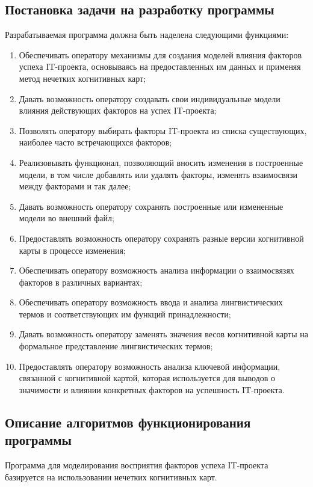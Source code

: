\documentclass{article}
\begin{document}
    \subsection {Постановка задачи на разработку программы}
    Разрабатываемая программа должна быть наделена следующими функциями:
    \begin{enumerate}
        \item  Обеспечивать оператору механизмы для создания моделей влияния факторов успеха IT-проекта, основываясь на предоставленных им данных и применяя метод нечетких когнитивных карт;
        \item  Давать возможность оператору создавать свои индивидуальные модели влияния действующих факторов на успех IT-проекта;
        \item  Позволять оператору выбирать факторы IT-проекта из списка существующих, наиболее часто встречающихся факторов;
        \item  Реализовывать функционал, позволяющий вносить изменения в построенные модели, в том числе добавлять или удалять факторы, изменять взаимосвязи между факторами и так далее;
        \item  Давать возможность оператору сохранять построенные или измененные модели во внешний файл;
        \item  Предоставлять возможность оператору сохранять разные версии когнитивной карты в процессе изменения;
        \item  Обеспечивать оператору возможность анализа информации о взаимосвязях факторов в различных вариантах;
        \item  Обеспечивать оператору возможность ввода и анализа лингвистических термов и соответствующих им функций принадлежности;
        \item  Давать возможность оператору заменять значения весов когнитивной карты на формальное представление лингвистических термов;
        \item  Предоставлять оператору возможность анализа ключевой информации, связанной с когнитивной картой, которая используется для выводов о значимости и влиянии конкретных факторов на успешность IT-проекта.
    \end{enumerate}
    \subsection{Описание алгоритмов функционирования программы}
    Программа для моделирования восприятия факторов успеха IT-проекта базируется на использовании нечетких когнитивных карт.
\end{document}
